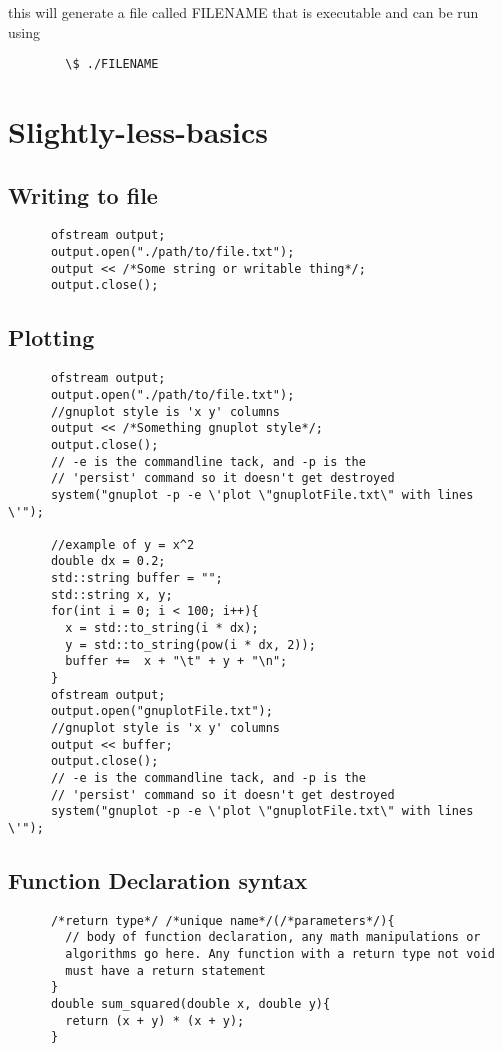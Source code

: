 \documentclass[12pt]{article}
\begin{document}
      this will generate a file called FILENAME that is executable and
      can be run using
      \begin{verbatim}
        \$ ./FILENAME
      \end{verbatim}

\section{Slightly-less-basics}
  \subsection{Writing to file}
    \begin{lstlisting}
      ofstream output;
      output.open("./path/to/file.txt");
      output << /*Some string or writable thing*/;
      output.close();
    \end{lstlisting}
  \subsection{Plotting}
    \begin{lstlisting}
      ofstream output;
      output.open("./path/to/file.txt");
      //gnuplot style is 'x y' columns
      output << /*Something gnuplot style*/;
      output.close();
      // -e is the commandline tack, and -p is the
      // 'persist' command so it doesn't get destroyed
      system("gnuplot -p -e \'plot \"gnuplotFile.txt\" with lines \'");
      
      //example of y = x^2
      double dx = 0.2;
      std::string buffer = "";
      std::string x, y;
      for(int i = 0; i < 100; i++){
        x = std::to_string(i * dx);
        y = std::to_string(pow(i * dx, 2));
        buffer +=  x + "\t" + y + "\n";
      }
      ofstream output;
      output.open("gnuplotFile.txt");
      //gnuplot style is 'x y' columns
      output << buffer;
      output.close();
      // -e is the commandline tack, and -p is the
      // 'persist' command so it doesn't get destroyed
      system("gnuplot -p -e \'plot \"gnuplotFile.txt\" with lines \'");
    \end{lstlisting}
  \subsection{Function Declaration syntax}
    \begin{lstlisting}
      /*return type*/ /*unique name*/(/*parameters*/){
        // body of function declaration, any math manipulations or
        algorithms go here. Any function with a return type not void
        must have a return statement
      }
      double sum_squared(double x, double y){
        return (x + y) * (x + y);
      }
    \end{lstlisting}
\end{document}

